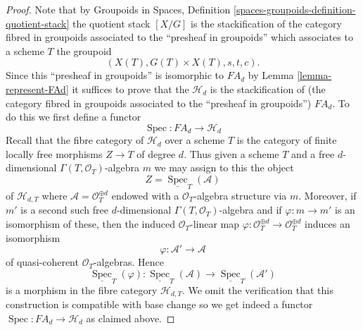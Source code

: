 \documentclass{stacks-project}
\theoremstyle{plain}
\theoremstyle{definition}
\theoremstyle{remark}
\numberwithin{equation}{subsection}
\def\Spec{\mathop{\mathrm{Spec}}}
\begin{document}
\begin{proof}
Note that by
Groupoids in Spaces, Definition
\ref{spaces-groupoids-definition-quotient-stack}
the quotient stack $[X/G]$ is the stackification of the
category fibred in groupoids associated to the ``presheaf in groupoids''
which associates to a scheme $T$ the groupoid
$$
(X(T), G(T) \times X(T), s, t, c).
$$
Since this ``presheaf in groupoids'' is isomorphic to $FA_d$ by
Lemma \ref{lemma-represent-FAd}
it suffices to prove that the $\mathcal{H}_d$ is the stackification
of (the category fibred in groupoids associated to the
``presheaf in groupoids'') $FA_d$. To do this we first define a
functor
$$
\Spec : FA_d \longrightarrow \mathcal{H}_d
$$
Recall that the fibre category of $\mathcal{H}_d$ over a scheme $T$
is the category of finite locally free morphisms $Z \to T$ of degree $d$.
Thus given a scheme $T$ and a free $d$-dimensional
$\Gamma(T, \mathcal{O}_T)$-algebra $m$ we may assign to this the object
$$
Z = \underline{\Spec}_T(\mathcal{A})
$$
of $\mathcal{H}_{d, T}$
where $\mathcal{A} = \mathcal{O}_T^{\oplus d}$ endowed with a
$\mathcal{O}_T$-algebra structure via $m$. Moreover, if $m'$ is
a second such free $d$-dimensional $\Gamma(T, \mathcal{O}_T)$-algebra
and if $\varphi : m \to m'$ is an isomorphism of these, then
the induced $\mathcal{O}_T$-linear map
$\varphi : \mathcal{O}_T^{\oplus d} \to \mathcal{O}_T^{\oplus d}$
induces an isomorphism
$$
\varphi : \mathcal{A}' \longrightarrow \mathcal{A}
$$
of quasi-coherent $\mathcal{O}_T$-algebras. Hence
$$
\underline{\Spec}_T(\varphi) :
\underline{\Spec}_T(\mathcal{A})
\longrightarrow
\underline{\Spec}_T(\mathcal{A}')
$$
is a morphism in the fibre category $\mathcal{H}_{d, T}$. We omit the
verification that this construction is compatible with base change so
we get indeed a functor $\Spec : FA_d \to \mathcal{H}_d$
as claimed above.


\end{proof}
\end{document}
